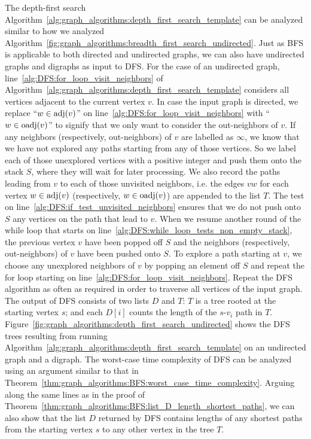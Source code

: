 The depth-first search
Algorithm~\ref{alg:graph_algorithms:depth_first_search_template} can
be analyzed similar to how we analyzed
Algorithm~\ref{fig:graph_algorithms:breadth_first_search_undirected}. Just
as BFS is applicable to both directed and undirected graphs, we can
also have undirected graphs and digraphs as input to DFS. For the case
of an undirected graph, line~\ref{alg:DFS:for_loop_visit_neighbors} of
Algorithm~\ref{alg:graph_algorithms:depth_first_search_template}
considers all vertices adjacent to the current vertex $v$. In case the
input graph is directed, we replace ``$w \in \operatorname*{adj}(v)$'' on
line~\ref{alg:DFS:for_loop_visit_neighbors} with ``$w \in \operatorname*{oadj}(v)$''
to signify that we only want to consider the out-neighbors of $v$. If
any neighbors (respectively, out-neighbors) of $v$ are labelled as
$\infty$, we know that we have not explored any paths starting from
any of those vertices. So we label each of those unexplored vertices
with a positive integer and push them onto the stack $S$, where they
will wait for later processing. We also record the paths leading from
$v$ to each of those unvisited neighbors, i.e. the edges $vw$ for each
vertex $w \in \operatorname*{adj}(v)$ (respectively, $w \in \operatorname*{oadj}(v)$) are appended
to the list $T$. The test on
line~\ref{alg:DFS:if_test_unvisited_neighbors} ensures that we do not
push onto $S$ any vertices on the path that lead to $v$. When we
resume another round of the while loop that starts on
line~\ref{alg:DFS:while_loop_tests_non_empty_stack}, the previous
vertex $v$ have been popped off $S$ and the neighbors (respectively,
out-neighbors) of $v$ have been pushed onto $S$. To explore a path
starting at $v$, we choose any unexplored neighbors of $v$ by popping
an element off $S$ and repeat the for loop starting on
line~\ref{alg:DFS:for_loop_visit_neighbors}. Repeat the DFS algorithm
as often as required in order to traverse all vertices of the input
graph. The output of DFS consists of two lists $D$ and $T$: $T$ is a
tree rooted at the starting vertex $s$; and each $D[i]$ counts the
length of the $s$-$v_i$ path in $T$.
Figure~\ref{fig:graph_algorithms:depth_first_search_undirected}
shows the DFS trees resulting from running
Algorithm~\ref{alg:graph_algorithms:depth_first_search_template} on an
undirected graph and a digraph. The worst-case time complexity of DFS
can be analyzed using an argument similar to that in
Theorem~\ref{thm:graph_algorithms:BFS:worst_case_time_complexity}. Arguing
along the same lines as in the proof of
Theorem~\ref{thm:graph_algorithms:BFS:list_D_length_shortest_paths},
we can also show that the list $D$ returned by DFS contains lengths of
any shortest paths from the starting vertex $s$ to any other vertex in
the tree $T$.

